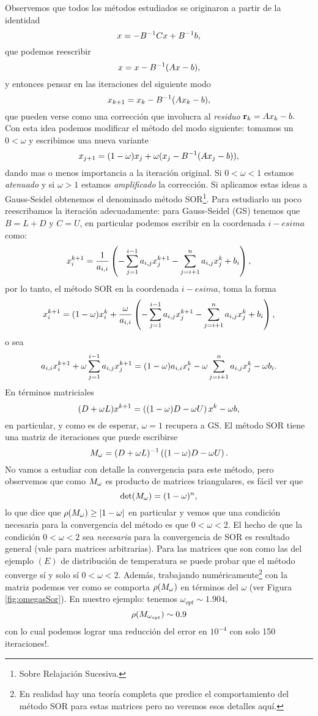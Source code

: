 Observemos que todos los métodos estudiados se originaron a partir de la identidad
$$
\xb=-\Bb^{-1}\Cb\xb+\Bb^{-1}\bb,
$$
que podemos reescribir
$$
\xb=\xb-\Bb^{-1}(\Ab\xb-\bb),
$$
y entonces pensar en las iteraciones del siguiente modo
$$
\xb_{k+1}=\xb_k-\Bb^{-1}(\Ab\xb_k-\bb),
$$
que pueden verse como una corrección que involucra al \emph{residuo} $\rb_k=\Ab\xb_k-\bb.$ Con esta idea podemos modificar el método del modo siguiente: tomamos un  $0<\omega$ y escribimos una nueva variante
$$
\xb_{j+1}=(1-\omega)\xb_j+
\omega(\xb_j-\Bb^{-1}(\Ab\xb_j-\bb)),
$$
dando mas o menos importancia a la iteración original. Si $0<\omega<1$ estamos \emph{atenuado} y si $\omega>1$ estamos  \emph{amplificado} la corrección. Si aplicamos estas ideas a Gauss-Seidel obtenemos el denominado método SOR\footnote{Sobre Relajación Sucesiva.}. Para estudiarlo un poco reescribamos la iteración adecuadamente:
para Gauss-Seidel (GS) tenemos que $B=L+D$ y $C=U$, en particular podemos escribir en la coordenada $i-esima$ como:
$$
\xb^{k+1}_i=\frac{1}{a_{i,i}}\left(-\sum_{j=1}^{i-1}a_{i,j}\xb_j^{k+1}-\sum_{j=i+1}^{n}a_{i,j}\xb_j^k+\bb_i\right),
$$
por lo tanto, el método SOR
 en la coordenada $i-esima$, toma la forma
$$
\xb^{k+1}_i=(1-\omega)\xb^k_i+
\frac{\omega}{a_{i,i}}\left(-\sum_{j=1}^{i-1}a_{i,j}\xb_j^{k+1}-\sum_{j=i+1}^{n}a_{i,j}\xb_j^k+\bb_i\right),
$$
o sea
$$
a_{i,i}\xb^{k+1}_i+\omega\sum_{j=1}^{i-1}a_{i,j}\xb_j^{k+1}=(1-\omega)a_{i,i}\xb^k_i-
\omega\sum_{j=i+1}^{n}a_{i,j}\xb_j^k -\omega\bb_i.
$$
En términos matriciales
$$
(\Db+\omega \Lb)\xb^{k+1}=\left((1-\omega)\Db-\omega\Ub\right)\xb^{k}-\omega \bb,
$$
en particular, y como es de esperar, $\omega=1$ recupera a GS. El método SOR tiene una matriz de iteraciones que puede escribirse
$$
\Mb_\omega=(\Db+\omega \Lb)^{-1}\left((1-\omega)\Db-\omega\Ub\right).
$$
No vamos a estudiar con detalle la convergencia para este método, pero observemos que como $\Mb_\omega$ es producto de matrices triangulares, es fácil ver que  
$$
\det (\Mb_\omega)=(1-\omega)^n,
$$
lo que dice que 
$\rho(\Mb_\omega)\ge |1-\omega|$
en particular y vemos que una condición necesaria para la convergencia del  m\'etodo  es que $0<\omega<2$.
\tcc
El hecho de que la condición $0<\omega<2$ sea \emph{necesaria} para la convergencia de SOR es resultado general (vale para matrices arbitrarias). Para las matrices que son como las del ejemplo $(E)$ de distribución de temperatura se puede probar que el método converge sí y solo sí $0<\omega<2$. Además, trabajando numéricamente\footnote{En realidad hay una teoría completa que predice el comportamiento del método SOR para estas matrices pero no veremos esos detalles aquí.} con la matriz podemos ver como se comporta $\rho(\Mb_\omega)$ en términos del $\omega$ (ver Figura \ref{fig:omegasSor}). En nuestro ejemplo:
tenemos $\omega_{opt}\sim 1.904$,
$$
\rho(\Mb_{\omega_{opt}})\sim 0.9
$$
con lo cual podemos lograr una reducción del error en $10^{-4}$ con solo 150 iteraciones!.
\etcc

